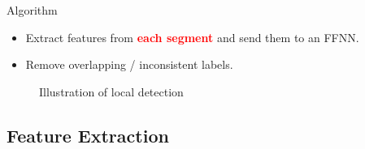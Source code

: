 \documentclass{beamer}
\begin{document}
\begin{frame}
\begin{block}{Algorithm}
	\begin{itemize}
	\item Extract features from \textbf{\textcolor{red}{each segment}} and send them to an FFNN.
	\item Remove overlapping / inconsistent labels.
	\end{itemize}
\end{block}
\begin{figure}
	\centering
	\caption{\scriptsize Illustration of local detection}
\end{figure}
\end{frame}


\subsection{Feature Extraction}
\end{document}
